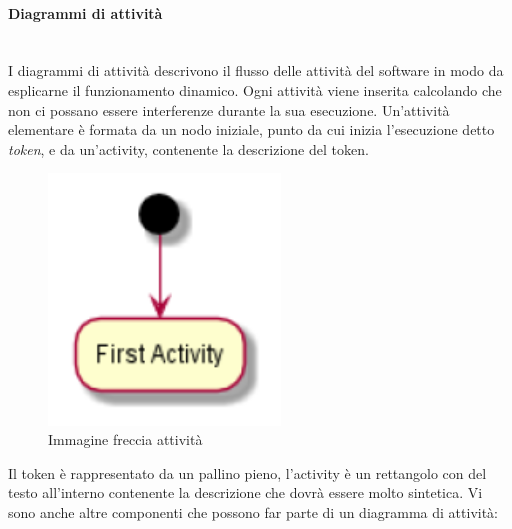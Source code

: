 \paragraph{Diagrammi di attività}\mbox{}\\[0.4cm]
I diagrammi di attività descrivono il flusso delle attività del software in modo da esplicarne il funzionamento dinamico. Ogni attività viene inserita calcolando che non ci possano essere interferenze durante la sua esecuzione. Un'attività elementare è formata da un nodo iniziale, punto da cui inizia l'esecuzione detto \textit{token}, e da un'activity, contenente la descrizione del token.
\begin{figure}[H]
	\begin{center}
		\includegraphics[width=0.55\textwidth]{../includes/pics/attivitabase.png}
		\caption{Immagine freccia attività}
	\end{center}
\end{figure}
Il token è rappresentato da un pallino pieno, l'activity è un rettangolo con del testo all'interno contenente la descrizione che dovrà essere molto sintetica. Vi sono anche altre componenti che possono far parte di un diagramma di attività:
